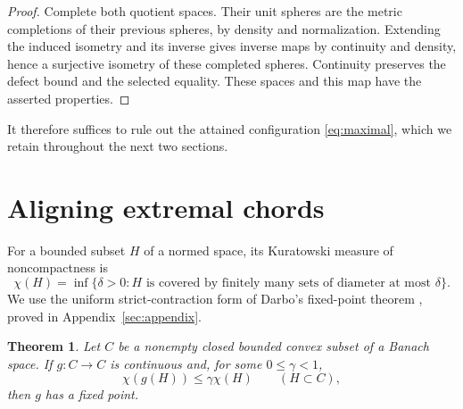 \documentclass[11pt]{article}
\newtheorem{theorem}{Theorem}[section]
\theoremstyle{remark}
\begin{document}
\begin{proof}
Complete both quotient spaces. Their unit spheres are the metric completions of their previous spheres, by density and normalization. Extending the induced isometry and its inverse gives inverse maps by continuity and density, hence a surjective isometry of these completed spheres. Continuity preserves the defect bound and the selected equality. These spaces and this map have the asserted properties.
\end{proof}

It therefore suffices to rule out the attained configuration \eqref{eq:maximal}, which we retain throughout the next two sections.

\section{Aligning extremal chords}\label{sec:alignment}

For a bounded subset $H$ of a normed space, its Kuratowski measure of noncompactness \cite{Kuratowski1930} is
\[
\chi(H)=\inf\{\delta>0:H\text{ is covered by finitely many sets of diameter at most }\delta\}.
\]
We use the uniform strict-contraction form of Darbo's fixed-point theorem \cite{Darbo1955}, proved in Appendix~\ref{sec:appendix}.

\begin{theorem}\label{thm:condensing}
Let $C$ be a nonempty closed bounded convex subset of a Banach space. If $g:C\to C$ is continuous and, for some $0\le\gamma<1$,
\[
\chi(g(H))\le\gamma\chi(H)\qquad(H\subset C),
\]
then $g$ has a fixed point.
\end{theorem}
\end{document}
